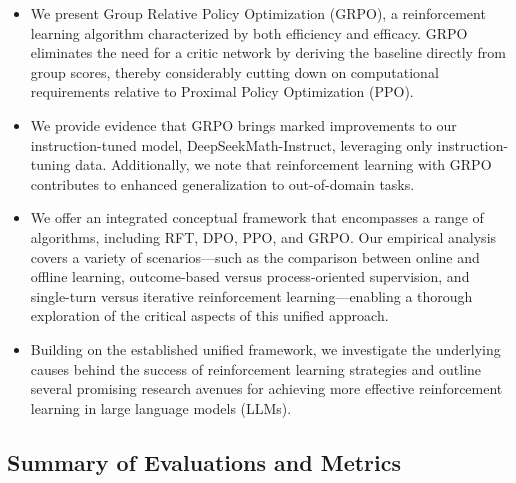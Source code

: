 \begin{itemize}[topsep=0pt]
    \item We present Group Relative Policy Optimization (GRPO), a reinforcement learning algorithm characterized by both efficiency and efficacy. GRPO eliminates the need for a critic network by deriving the baseline directly from group scores, thereby considerably cutting down on computational requirements relative to Proximal Policy Optimization (PPO).
    \item We provide evidence that GRPO brings marked improvements to our instruction-tuned model, DeepSeekMath-Instruct, leveraging only instruction-tuning data. Additionally, we note that reinforcement learning with GRPO contributes to enhanced generalization to out-of-domain tasks.
    \item We offer an integrated conceptual framework that encompasses a range of algorithms, including RFT, DPO, PPO, and GRPO. Our empirical analysis covers a variety of scenarios—such as the comparison between online and offline learning, outcome-based versus process-oriented supervision, and single-turn versus iterative reinforcement learning—enabling a thorough exploration of the critical aspects of this unified approach.
    \item Building on the established unified framework, we investigate the underlying causes behind the success of reinforcement learning strategies and outline several promising research avenues for achieving more effective reinforcement learning in large language models (LLMs).
\end{itemize}

\subsection{Summary of Evaluations and Metrics}

